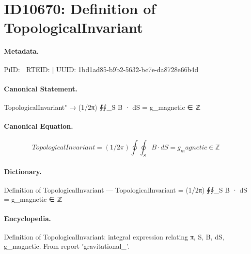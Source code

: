 \section*{ID10670: Definition of TopologicalInvariant}
\paragraph{Metadata.}
PiID:  | RTEID:  | UUID: 1bd1ad85-b9b2-5632-bc7e-da8728e66b4d

\paragraph{Canonical Statement.}
TopologicalInvariant" → (1/2π) ∮∮\_S B · dS = g\_magnetic ∈ ℤ

\paragraph{Canonical Equation.}
\[
TopologicalInvariant = (1/2π) ∮∮_S B · dS = g_magnetic ∈ ℤ
\]

\paragraph{Dictionary.}
Definition of TopologicalInvariant — TopologicalInvariant = (1/2π) ∮∮\_S B · dS = g\_magnetic ∈ ℤ

\paragraph{Encyclopedia.}
Definition of TopologicalInvariant: integral expression relating π, S, B, dS, g\_magnetic. From report 'gravitational\_'.
